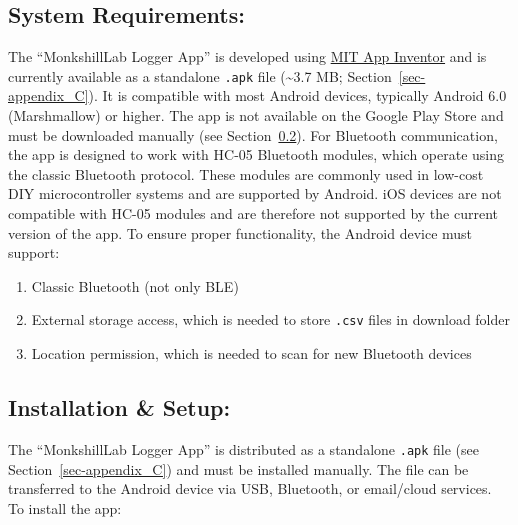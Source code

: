 \documentclass[
  11pt,
  letterpaper,
]{book}
\providecommand{\tightlist}{%
  \setlength{\itemsep}{0pt}\setlength{\parskip}{0pt}}
\begin{document}
\subsection{System
Requirements:}\label{sec-monkshilllab-app-requirements}

The ``MonkshillLab Logger App'' is developed using
\href{https://appinventor.mit.edu/}{MIT App Inventor} and is currently
available as a standalone \texttt{.apk} file (\textasciitilde3.7 MB;
Section~\ref{sec-appendix_C}). It is compatible with most Android
devices, typically Android 6.0 (Marshmallow) or higher. The app is not
available on the Google Play Store and must be downloaded manually (see
Section~\ref{sec-monkshilllab-app-installation}). For Bluetooth
communication, the app is designed to work with HC-05 Bluetooth modules,
which operate using the classic Bluetooth protocol. These modules are
commonly used in low-cost DIY microcontroller systems and are supported
by Android. iOS devices are not compatible with HC-05 modules and are
therefore not supported by the current version of the app. To ensure
proper functionality, the Android device must support:

\begin{enumerate}
\def\labelenumi{\arabic{enumi}.}
\tightlist
\item
  Classic Bluetooth (not only BLE)
\item
  External storage access, which is needed to store \texttt{.csv} files
  in download folder
\item
  Location permission, which is needed to scan for new Bluetooth devices
\end{enumerate}

\subsection{Installation \&
Setup:}\label{sec-monkshilllab-app-installation}

The ``MonkshillLab Logger App'' is distributed as a standalone
\texttt{.apk} file (see Section~\ref{sec-appendix_C}) and must be
installed manually. The file can be transferred to the Android device
via USB, Bluetooth, or email/cloud services. To install the app:
\end{document}

